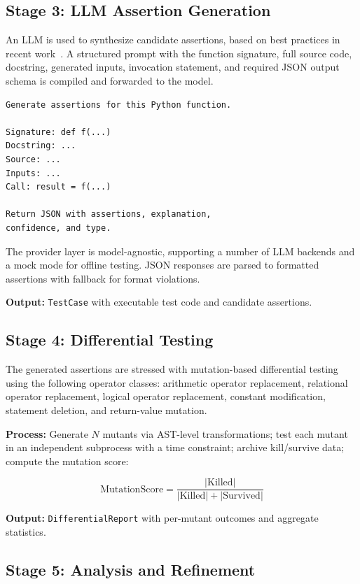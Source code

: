 \documentclass[conference]{IEEEtran}
\begin{document}
\subsection{Stage 3: LLM Assertion Generation}

An LLM is used to synthesize candidate assertions, based on best practices in recent work~\cite{hayet2024chatassert,hossain2024togll,hossain2025doc2oracll}. A structured prompt with the function signature, full source code, docstring, generated inputs, invocation statement, and required JSON output schema is compiled and forwarded to the model.

\begin{lstlisting}
Generate assertions for this Python function.

Signature: def f(...)
Docstring: ...
Source: ...
Inputs: ...
Call: result = f(...)

Return JSON with assertions, explanation,
confidence, and type.
\end{lstlisting}

The provider layer is model-agnostic, supporting a number of LLM backends and a mock mode for offline testing. JSON responses are parsed to formatted assertions with fallback for format violations.

\textbf{Output:} \texttt{TestCase} with executable test code and candidate assertions.

\subsection{Stage 4: Differential Testing}

The generated assertions are stressed with mutation-based differential testing~\cite{jia2011mutation,papadakis2019mutation} using the following operator classes: arithmetic operator replacement, relational operator replacement, logical operator replacement, constant modification, statement deletion, and return-value mutation.

\textbf{Process:} Generate $N$ mutants via AST-level transformations; test each mutant in an independent subprocess with a time constraint; archive kill/survive data; compute the mutation score:

\[
\text{MutationScore} = \frac{|\text{Killed}|}{|\text{Killed}| + |\text{Survived}|}
\]

\textbf{Output:} \texttt{DifferentialReport} with per-mutant outcomes and aggregate statistics.

\subsection{Stage 5: Analysis and Refinement}
\end{document}
